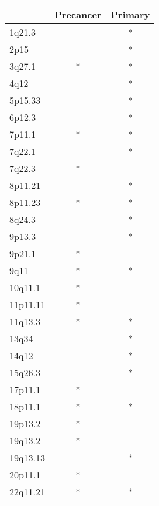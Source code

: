 \begin{tabular}{lcc}
\toprule
{} & Precancer & Primary \\
\midrule
1q21.3   &           &       * \\
2p15     &           &       * \\
3q27.1   &         * &       * \\
4q12     &           &       * \\
5p15.33  &           &       * \\
6p12.3   &           &       * \\
7p11.1   &         * &       * \\
7q22.1   &           &       * \\
7q22.3   &         * &         \\
8p11.21  &           &       * \\
8p11.23  &         * &       * \\
8q24.3   &           &       * \\
9p13.3   &           &       * \\
9p21.1   &         * &         \\
9q11     &         * &       * \\
10q11.1  &         * &         \\
11p11.11 &         * &         \\
11q13.3  &         * &       * \\
13q34    &           &       * \\
14q12    &           &       * \\
15q26.3  &           &       * \\
17p11.1  &         * &         \\
18p11.1  &         * &       * \\
19p13.2  &         * &         \\
19q13.2  &         * &         \\
19q13.13 &           &       * \\
20p11.1  &         * &         \\
22q11.21 &         * &       * \\
\bottomrule
\end{tabular}
